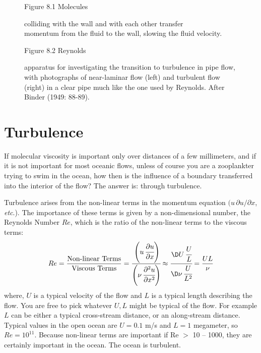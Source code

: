 \begin{figure}[t!]
\centering
\footnotesize
Figure 8.1 Molecules \rule{0mm}{4ex}colliding with the wall and with
each other transfer\\momentum from the fluid to the wall, slowing the
fluid velocity.

\label{fig:viscositysketch}
\vspace{-3ex}
\end{figure}

\begin{figure}[t!]
\footnotesize
Figure 8.2 Reynolds \rule{0mm}{4ex}apparatus for investigating the
transition to turbulence in pipe flow,
with photographs of near-laminar flow (left) and turbulent flow
(right) in a clear pipe much like the one used by Reynolds. After
Binder (1949: 88-89).
\label{fig:reynoldsexp}
\vspace{-4ex}
\end{figure}

\section{Turbulence}
If molecular viscosity is important only
over distances of a few millimeters, and if it is not important for
most oceanic flows, unless of course you are a zooplankter trying to
swim in the ocean, how then is the influence of a boundary transferred
into the interior of the flow? The answer is: through turbulence.

Turbulence arises from the non-linear terms in the momentum equation
$(u\,\partial{u}/\partial{x}$, \textit{etc}.). The importance of these
terms is given by a non-dimensional number, the Reynolds Number $Re$,
which is the ratio of the non-linear terms to the viscous terms:
\begin{equation}
Re = \frac{\text{Non-linear Terms}}{\text{Viscous
Terms}} =
\cfrac{\left( \displaystyle u\,\cfrac{\partial{u}}{\partial{x}}\right) }{\left( \displaystyle \nu\,\cfrac{\partial^2{u}}{\partial{x^2}}\right)
} \approx \cfrac{\D U\,\cfrac{U}{L\vphantom{y}}}{\D \nu\,\cfrac{U}{L^2}}
= \frac{UL}{\nu}
\end{equation}
where, $U$ is a typical velocity of the flow and $L$ is a typical
length describing the flow. You are free to pick whatever $U,L$ might
be typical of the flow. For example $L$ can be either a typical
cross-stream distance, or an along-stream distance. Typical values in
the open ocean are $U = 0.1$ m/s and $L = 1$ megameter, so
$Re = 10^{11}$. Because non-linear terms are important if Re $>$ 10 -- 1000,
they are certainly important in the ocean. The ocean is turbulent.

